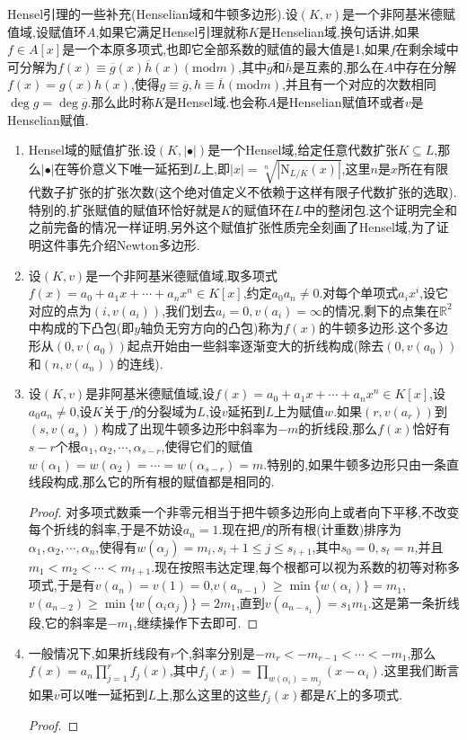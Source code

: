 Hensel引理的一些补充(Henselian域和牛顿多边形).设$(K,v)$是一个非阿基米德赋值域,设赋值环$A$,如果它满足Hensel引理就称$K$是Henselian域.换句话讲,如果$f\in A[x]$是一个本原多项式,也即它全部系数的赋值的最大值是1,如果$f$在剩余域中可分解为$f(x)\equiv\overline{g}(x)\overline{h}(x)(\mathrm{mod}m)$,其中$\overline{g}$和$\overline{h}$是互素的,那么在$A$中存在分解$f(x)=g(x)h(x)$,使得$g\equiv\overline{g},h\equiv\overline{h}(\mathrm{mod}m)$,并且有一个对应的次数相同$\deg g=\deg\overline{g}$.那么此时称$K$是Hensel域.也会称$A$是Henselian赋值环或者$v$是Henselian赋值.
\begin{enumerate}
	\item Hensel域的赋值扩张.设$(K,|\bullet|)$是一个Hensel域,给定任意代数扩张$K\subseteq L$,那么$|\bullet|$在等价意义下唯一延拓到$L$上,即$|x|=\sqrt[n]{|\mathrm{N}_{L/K}(x)|}$,这里$n$是$x$所在有限代数子扩张的扩张次数(这个绝对值定义不依赖于这样有限子代数扩张的选取).特别的,扩张赋值的赋值环恰好就是$K$的赋值环在$L$中的整闭包.这个证明完全和之前完备的情况一样证明,另外这个赋值扩张性质完全刻画了Hensel域,为了证明这件事先介绍Newton多边形.
	\item 设$(K,v)$是一个非阿基米德赋值域,取多项式$f(x)=a_0+a_1x+\cdots+a_nx^n\in K[x]$,约定$a_0a_n\not=0$.对每个单项式$a_ix^i$,设它对应的点为$(i,v(a_i))$,我们划去$a_i=0,v(a_i)=\infty$的情况,剩下的点集在$\mathbb{R}^2$中构成的下凸包(即$y$轴负无穷方向的凸包)称为$f(x)$的牛顿多边形.这个多边形从$(0,v(a_0))$起点开始由一些斜率逐渐变大的折线构成(除去$(0,v(a_0))$和$(n,v(a_n))$的连线).
	\item 设$(K,v)$是非阿基米德赋值域,设$f(x)=a_0+a_1x+\cdots+a_nx^n\in K[x]$,设$a_0a_n\not=0$,设$K$关于$f$的分裂域为$L$,设$v$延拓到$L$上为赋值$w$.如果$(r,v(a_r))$到$(s,v(a_s))$构成了出现牛顿多边形中斜率为$-m$的折线段,那么$f(x)$恰好有$s-r$个根$\alpha_1,\alpha_2,\cdots,\alpha_{s-r}$,使得它们的赋值$w(\alpha_1)=w(\alpha_2)=\cdots=w(\alpha_{s-r})=m$.特别的,如果牛顿多边形只由一条直线段构成,那么它的所有根的赋值都是相同的.
	\begin{proof}
		
		对多项式数乘一个非零元相当于把牛顿多边形向上或者向下平移,不改变每个折线的斜率,于是不妨设$a_n=1$.现在把$f$的所有根(计重数)排序为$\alpha_1,\alpha_2,\cdots,\alpha_n$,使得有$w(\alpha_j)=m_i,s_i+1\le j\le s_{i+1}$,其中$s_0=0,s_t=n$,并且$m_1<m_2<\cdots<m_{t+1}$.现在按照韦达定理,每个根都可以视为系数的初等对称多项式,于是有$v(a_n)=v(1)=0$,$v(a_{n-1})\ge\min\{w(\alpha_i)\}=m_1$,$v(a_{n-2})\ge\min\{w(\alpha_i\alpha_j)\}=2m_1$,直到$v(a_{n-s_1})=s_1m_1$.这是第一条折线段,它的斜率是$-m_1$,继续操作下去即可.
	\end{proof}
	\item 一般情况下,如果折线段有$r$个,斜率分别是$-m_r<-m_{r-1}<\cdots<-m_1$,那么$f(x)=a_n\prod_{j=1}^rf_j(x)$,其中$f_j(x)=\prod\limits_{w(\alpha_i)=m_j}(x-\alpha_i)$.这里我们断言如果$v$可以唯一延拓到$L$上,那么这里的这些$f_j(x)$都是$K$上的多项式.
	\begin{proof}
		

\end{proof}
\end{enumerate}
